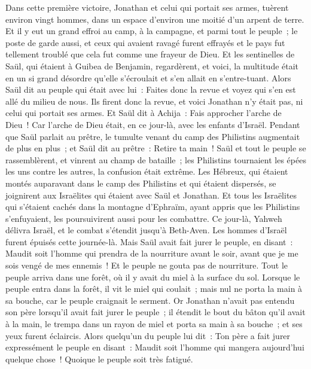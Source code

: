 \begin{multicols}{2}
Dans cette première victoire, Jonathan et celui qui portait ses armes, tuèrent environ vingt hommes, dans un espace d'environ une moitié d'un arpent de terre.
Et il y eut un grand effroi au camp, à la campagne, et parmi tout le peuple~; le poste de garde aussi, et ceux qui avaient ravagé furent effrayés et le pays fut tellement troublé que cela fut comme une frayeur de Dieu.
Et les sentinelles de Saül, qui étaient à Guibea de Benjamin, regardèrent, et voici, la multitude était en un si grand désordre qu'elle s'écroulait et s'en allait en s'entre-tuant.
Alors Saül dit au peuple qui était avec lui~: Faites donc la revue et voyez qui s'en est allé du milieu de nous. Ils firent donc la revue, et voici Jonathan n'y était pas, ni celui qui portait ses armes.
Et Saül dit à Achija~: Fais approcher l'arche de Dieu~! Car l'arche de Dieu était, en ce jour-là, avec les enfants d'Israël.
Pendant que Saül parlait au prêtre, le tumulte venant du camp des Philistins augmentait de plus en plus~; et Saül dit au prêtre~: Retire ta main~!
Saül et tout le peuple se rassemblèrent, et vinrent au champ de bataille~; les Philistins tournaient les épées les uns contre les autres, la confusion était extrême.
Les Hébreux, qui étaient montés auparavant dans le camp des Philistins et qui étaient dispersés, se joignirent aux Israëlites qui étaient avec Saül et Jonathan.
Et tous les Israëlites qui s'étaient cachés dans la montagne d'Ephraïm, ayant appris que les Philistins s'enfuyaient, les poursuivirent aussi pour les combattre.
Ce jour-là, Yahweh délivra Israël, et le combat s'étendit jusqu'à Beth-Aven.
Les hommes d'Israël furent épuisés cette journée-là. Mais Saül avait fait jurer le peuple, en disant~: Maudit soit l'homme qui prendra de la nourriture avant le soir, avant que je me sois vengé de mes ennemis~! Et le peuple ne gouta pas de nourriture.
Tout le peuple arriva dans une forêt, où il y avait du miel à la surface du sol.
Lorsque le peuple entra dans la forêt, il vit le miel qui coulait~; mais nul ne porta la main à sa bouche, car le peuple craignait le serment.
Or Jonathan n'avait pas entendu son père lorsqu'il avait fait jurer le peuple~; il étendit le bout du bâton qu'il avait à la main, le trempa dans un rayon de miel et porta sa main à sa bouche~; et ses yeux furent éclaircis.
Alors quelqu'un du peuple lui dit~: Ton père a fait jurer expressément le peuple en disant~: Maudit soit l'homme qui mangera aujourd'hui quelque chose~! Quoique le peuple soit très fatigué.

\end{multicols}
